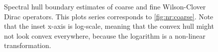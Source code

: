 \begin{figure}
\centering

\hfill
{}

\hfill
{}

\caption{
Spectral hull boundary estimates of coarse and fine Wilson-Clover Dirac operators.
This plots series corresponds to \cref{fig:nr:coarse}.
Note that the inset x-axis is log-scale, meaning that the convex hull might not look convex everywhere, because the logarithm is a non-linear transformation.
}
\label{fig:ch:coarse}
\end{figure}

